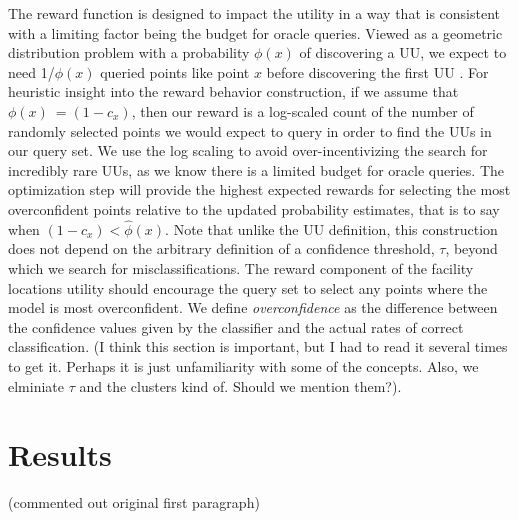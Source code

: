 \documentclass[letterpaper]{article} %
\newcommand{\km}[1]{{\color{red} #1}} %
\newcommand{\wdb}[1]{{\color{blue} #1}} %
\begin{document}
The reward function is designed to impact the utility in a way that is consistent with a limiting factor being the budget for oracle queries. Viewed as a geometric distribution problem with a probability $\phi(x)$ of discovering a UU, we expect to need 1/$\phi(x)$ queried points like point $x$ before discovering the first UU \citep{casella2002statistical}. For heuristic insight into the reward behavior construction, if we assume that   $\phi(x) ~= (1-c_x )$, then our reward is a log-scaled count of the number of randomly selected points we would expect to query in order to find the UUs in our query set. We use the log scaling to avoid over-incentivizing the search for incredibly rare UUs, as we know there is a limited budget for oracle queries. The optimization step will provide the highest expected rewards for selecting the most overconfident points relative to the updated probability estimates, that is to say when $(1-c_x )< \hat{\phi}(x)$. Note that unlike the UU definition, this construction does not depend on the arbitrary definition of a confidence threshold, $\tau$, beyond which we search for misclassifications. The reward component of the facility locations utility should encourage the query set to select any points where the model is most overconfident. We define \textit{overconfidence} as the difference between the confidence values given by the classifier and the actual rates of correct classification. \wdb{(I think this section is important, but I had to read it several times to get it. Perhaps it is just unfamiliarity with some of the concepts. Also, we elminiate $\tau$ and the clusters kind of. Should we mention them?)}.


\section{Results}

\wdb{(commented out original first paragraph)}
\end{document}
